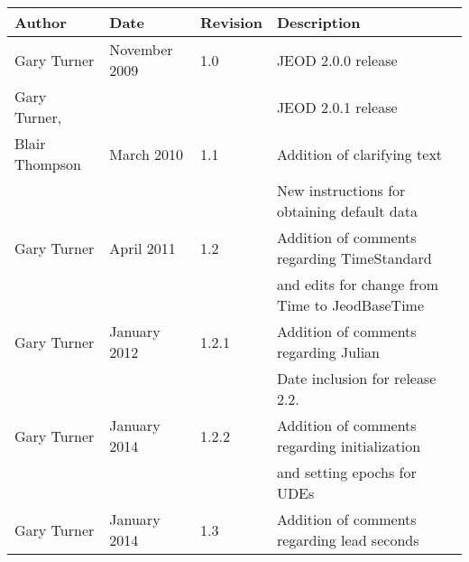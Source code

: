%
%
% 
%



\begin{tabular}{||l|l|l|l|} \hline
 {\bf Author} & {\bf Date} &  {\bf Revision} & {\bf Description} \\ \hline \hline
 Gary Turner    & November 2009 & 1.0  & JEOD 2.0.0 release \\ \hline
 Gary Turner,   &             &       & JEOD 2.0.1 release \\ 
 Blair Thompson & March 2010 & 1.1 & Addition of clarifying text \\
                &             &       &   New instructions for obtaining default data \\ \hline
  Gary Turner   & April 2011  & 1.2 & Addition of comments regarding TimeStandard \\ 
     &      &     & and edits for change from Time to JeodBaseTime  \\ \hline
  Gary Turner   & January 2012  & 1.2.1 & Addition of comments regarding Julian \\ 
     &      &     & Date inclusion for release 2.2.  \\ \hline
  Gary Turner   & January 2014  & 1.2.2 & Addition of comments regarding initialization \\
     &      &     & and setting epochs for UDEs   \\ \hline
  Gary Turner   & January 2014  & 1.3 & Addition of comments regarding lead seconds \\ \hline
\end{tabular}
